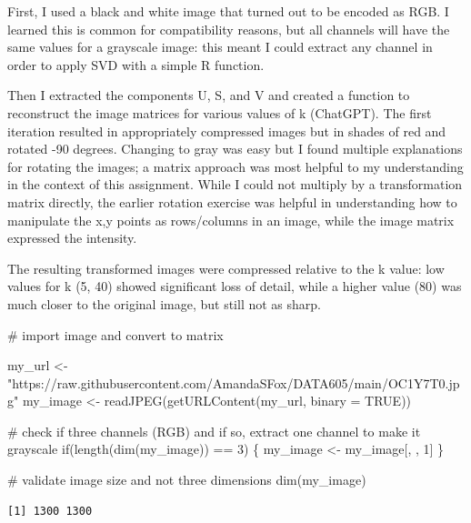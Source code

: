 \documentclass[
  letterpaper,
  DIV=11,
  numbers=noendperiod]{scrartcl}
\newenvironment{Shaded}{\begin{snugshade}}{\end{snugshade}}
\newcommand{\AttributeTok}[1]{\textcolor[rgb]{0.40,0.45,0.13}{#1}}
\newcommand{\CommentTok}[1]{\textcolor[rgb]{0.37,0.37,0.37}{#1}}
\newcommand{\ConstantTok}[1]{\textcolor[rgb]{0.56,0.35,0.01}{#1}}
\newcommand{\ControlFlowTok}[1]{\textcolor[rgb]{0.00,0.23,0.31}{#1}}
\newcommand{\DecValTok}[1]{\textcolor[rgb]{0.68,0.00,0.00}{#1}}
\newcommand{\FunctionTok}[1]{\textcolor[rgb]{0.28,0.35,0.67}{#1}}
\newcommand{\NormalTok}[1]{\textcolor[rgb]{0.00,0.23,0.31}{#1}}
\newcommand{\OtherTok}[1]{\textcolor[rgb]{0.00,0.23,0.31}{#1}}
\newcommand{\SpecialCharTok}[1]{\textcolor[rgb]{0.37,0.37,0.37}{#1}}
\newcommand{\StringTok}[1]{\textcolor[rgb]{0.13,0.47,0.30}{#1}}
\begin{document}
First, I used a black and white image that turned out to be encoded as
RGB. I learned this is common for compatibility reasons, but all
channels will have the same values for a grayscale image: this meant I
could extract any channel in order to apply SVD with a simple R
function.

Then I extracted the components U, S, and V and created a function to
reconstruct the image matrices for various values of k (ChatGPT). The
first iteration resulted in appropriately compressed images but in
shades of red and rotated -90 degrees. Changing to gray was easy but I
found multiple explanations for rotating the images; a matrix approach
was most helpful to my understanding in the context of this assignment.
While I could not multiply by a transformation matrix directly, the
earlier rotation exercise was helpful in understanding how to manipulate
the x,y points as rows/columns in an image, while the image matrix
expressed the intensity.

The resulting transformed images were compressed relative to the k
value: low values for k (5, 40) showed significant loss of detail, while
a higher value (80) was much closer to the original image, but still not
as sharp.

\begin{Shaded}
\begin{Highlighting}[]
\CommentTok{\# import image and convert to matrix}

\NormalTok{my\_url }\OtherTok{\textless{}{-}} \StringTok{"https://raw.githubusercontent.com/AmandaSFox/DATA605/main/OC1Y7T0.jpg"}
\NormalTok{my\_image }\OtherTok{\textless{}{-}} \FunctionTok{readJPEG}\NormalTok{(}\FunctionTok{getURLContent}\NormalTok{(my\_url, }\AttributeTok{binary =} \ConstantTok{TRUE}\NormalTok{))}

\CommentTok{\# check if three channels (RGB) and if so, extract one channel to make it grayscale}
\ControlFlowTok{if}\NormalTok{(}\FunctionTok{length}\NormalTok{(}\FunctionTok{dim}\NormalTok{(my\_image)) }\SpecialCharTok{==} \DecValTok{3}\NormalTok{) \{}
\NormalTok{  my\_image }\OtherTok{\textless{}{-}}\NormalTok{ my\_image[, , }\DecValTok{1}\NormalTok{] }
\NormalTok{  \}}

\CommentTok{\# validate image size and not three dimensions }
\FunctionTok{dim}\NormalTok{(my\_image)}
\end{Highlighting}
\end{Shaded}

\begin{verbatim}
[1] 1300 1300
\end{verbatim}
\end{document}

